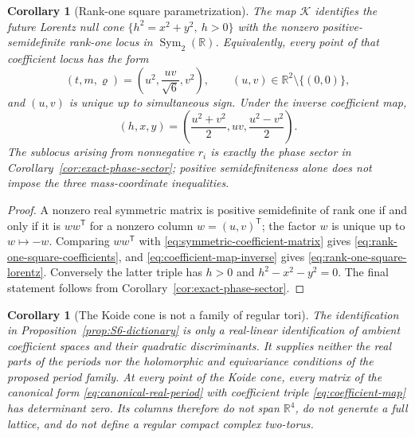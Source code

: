 \documentclass[11pt]{article}
\numberwithin{equation}{section}
\newtheorem{corollary}[theorem]{Corollary}
\theoremstyle{definition}
\theoremstyle{remark}
\newcommand{\R}{\mathbb R}
\begin{document}
\begin{corollary}[Rank-one square parametrization]
\label{cor:rank-one-square}
The map $\mathcal K$ identifies the future Lorentz null cone
$\{h^2=x^2+y^2,\ h>0\}$ with the nonzero positive-semidefinite rank-one
locus in $\operatorname{Sym}_2(\R)$.  Equivalently, every point of that
coefficient locus has the form
\begin{equation}
 (t,m,\varrho)=
 \left(u^2,\frac{uv}{\sqrt6},v^2\right),
 \qquad (u,v)\in\R^2\setminus\{(0,0)\},
 \label{eq:rank-one-square-coefficients}
\end{equation}
and $(u,v)$ is unique up to simultaneous sign.  Under the inverse
coefficient map,
\begin{equation}
 (h,x,y)=
 \left(\frac{u^2+v^2}{2},uv,\frac{u^2-v^2}{2}\right).
 \label{eq:rank-one-square-lorentz}
\end{equation}
The sublocus arising from nonnegative $r_i$ is exactly the phase sector in
Corollary~\ref{cor:exact-phase-sector}; positive semidefiniteness alone does
not impose the three mass-coordinate inequalities.
\end{corollary}

\begin{proof}
A nonzero real symmetric matrix is positive semidefinite of rank one if and
only if it is $ww^{\mathsf T}$ for a nonzero column $w=(u,v)^{\mathsf T}$;
the factor $w$ is unique up to $w\mapsto-w$.  Comparing
$ww^{\mathsf T}$ with \eqref{eq:symmetric-coefficient-matrix} gives
\eqref{eq:rank-one-square-coefficients}, and
\eqref{eq:coefficient-map-inverse} gives
\eqref{eq:rank-one-square-lorentz}.  Conversely the latter triple has
$h>0$ and $h^2-x^2-y^2=0$.  The final statement follows from
Corollary~\ref{cor:exact-phase-sector}.
\end{proof}

\begin{corollary}[The Koide cone is not a family of regular tori]
\label{cor:ambient-only}
The identification in Proposition~\ref{prop:S6-dictionary} is only a
real-linear identification of ambient coefficient spaces and their quadratic
discriminants.  It supplies neither the real parts of the periods nor the
holomorphic and equivariance conditions of the proposed period family.  At
every point of the Koide cone, every matrix of the canonical form
\eqref{eq:canonical-real-period} with coefficient triple
\eqref{eq:coefficient-map} has determinant zero.  Its columns therefore do
not span $\R^4$, do not generate a full lattice, and do not define a regular
compact complex two-torus.
\end{corollary}
\end{document}
